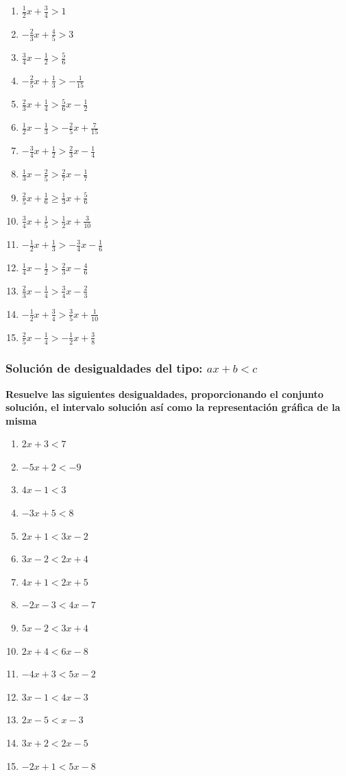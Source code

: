 \documentclass[12pt]{article}
\begin{document}
\begin{enumerate}
\def\labelenumi{\arabic{enumi}.}
\item
  \(\frac{1}{2}x+\frac{3}{4}>1\)
\item
  \(-\frac{2}{3}x+\frac{4}{5}>3\)
\item
  \(\frac{3}{4}x-\frac{1}{2}>\frac{5}{6}\)
\item
  \(-\frac{2}{5}x+\frac{1}{3}>-\frac{1}{15}\)
\item
  \(\frac{2}{3}x+\frac{1}{4}>\frac{5}{6}x-\frac{1}{2}\)
\item
  \(\frac{1}{2}x-\frac{1}{3}>-\frac{2}{5}x+\frac{7}{15}\)
\item
  \(-\frac{3}{4}x+\frac{1}{2}>\frac{2}{3}x-\frac{1}{4}\)
\item
  \(\frac{1}{3}x-\frac{2}{5}>\frac{2}{7}x-\frac{1}{7}\)
\item
  \(\frac{2}{5}x+\frac{1}{6}\geq\frac{1}{3}x+\frac{5}{6}\)
\item
  \(\frac{3}{4}x+\frac{1}{5}>\frac{1}{2}x+\frac{3}{10}\)
\item
  \(-\frac{1}{2}x+\frac{1}{3}>-\frac{3}{4}x-\frac{1}{6}\)
\item
  \(\frac{1}{4}x-\frac{1}{2}>\frac{2}{3}x-\frac{4}{6}\)
\item
  \(\frac{2}{3}x-\frac{1}{4}>\frac{3}{4}x-\frac{2}{3}\)
\item
  \(-\frac{1}{2}x+\frac{3}{4}>\frac{3}{5}x+\frac{1}{10}\)
\item
  \(\frac{2}{5}x-\frac{1}{4}>-\frac{1}{2}x+\frac{3}{8}\)
\end{enumerate}

\subsubsection{\texorpdfstring{Solución de desigualdades del tipo:
\(ax+b<c\)}{Solución de desigualdades del tipo: ax+b\textless c}}\label{soluciuxf3n-de-desigualdades-del-tipo-axbc-1}

\textbf{Resuelve las siguientes desigualdades, proporcionando el
conjunto solución, el intervalo solución así como la representación
gráfica de la misma}

\begin{enumerate}
\def\labelenumi{\arabic{enumi}.}
\item
  \(2x+3<7\)
\item
  \(-5x+2<-9\)
\item
  \(4x-1<3\)
\item
  \(-3x+5<8\)
\item
  \(2x+1<3x-2\)
\item
  \(3x-2<2x+4\)
\item
  \(4x+1<2x+5\)
\item
  \(-2x-3<4x-7\)
\item
  \(5x-2<3x+4\)
\item
  \(2x+4<6x-8\)
\item
  \(-4x+3<5x-2\)
\item
  \(3x-1<4x-3\)
\item
  \(2x-5<x-3\)
\item
  \(3x+2<2x-5\)
\item
  \(-2x+1<5x-8\)
\end{enumerate}
\end{document}
